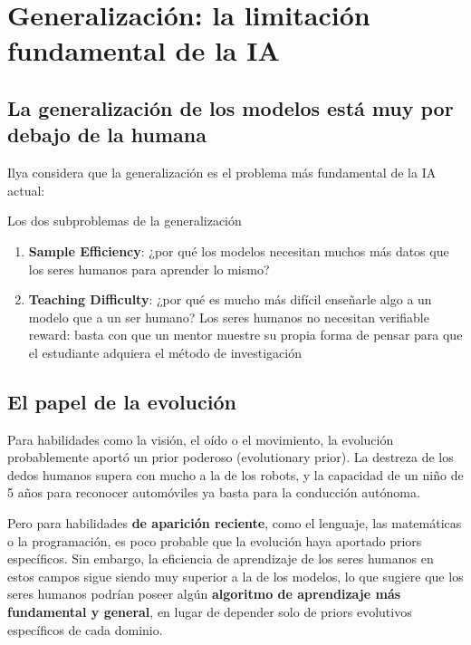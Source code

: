 \section{Generalización: la limitación fundamental de la IA}

\subsection{La generalización de los modelos está muy por debajo de la humana}

Ilya considera que la generalización es el problema más fundamental de la IA actual:

\begin{importantbox}{Los dos subproblemas de la generalización}
\begin{enumerate}
    \item \textbf{Sample Efficiency}: ¿por qué los modelos necesitan muchos más datos que los seres humanos para aprender lo mismo?
    \item \textbf{Teaching Difficulty}: ¿por qué es mucho más difícil enseñarle algo a un modelo que a un ser humano? Los seres humanos no necesitan verifiable reward: basta con que un mentor muestre su propia forma de pensar para que el estudiante adquiera el método de investigación
\end{enumerate}
\end{importantbox}

\subsection{El papel de la evolución}

Para habilidades como la visión, el oído o el movimiento, la evolución probablemente aportó un prior poderoso (evolutionary prior). La destreza de los dedos humanos supera con mucho a la de los robots, y la capacidad de un niño de 5 años para reconocer automóviles ya basta para la conducción autónoma.

Pero para habilidades \textbf{de aparición reciente}, como el lenguaje, las matemáticas o la programación, es poco probable que la evolución haya aportado priors específicos. Sin embargo, la eficiencia de aprendizaje de los seres humanos en estos campos sigue siendo muy superior a la de los modelos, lo que sugiere que los seres humanos podrían poseer algún \textbf{algoritmo de aprendizaje más fundamental y general}, en lugar de depender solo de priors evolutivos específicos de cada dominio.

